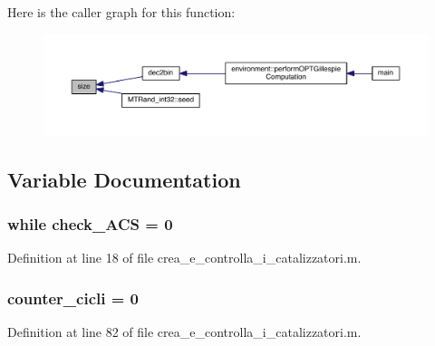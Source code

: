 Here is the caller graph for this function\-:\nopagebreak
\begin{figure}[H]
\begin{center}
\leavevmode
\includegraphics[width=350pt]{a00062_ae113ea7f9e515a12ac4b5595c6faf61e_icgraph}
\end{center}
\end{figure}




\subsection{Variable Documentation}
\hypertarget{a00062_a516aa1002f0c1375a671e40ee7b79e07}{
\subsubsection[{check\-\_\-\-A\-C\-S}]{\setlength{\rightskip}{0pt plus 5cm}while check\-\_\-\-A\-C\-S = 0}}\label{a00062_a516aa1002f0c1375a671e40ee7b79e07}


Definition at line 18 of file crea\-\_\-e\-\_\-controlla\-\_\-i\-\_\-catalizzatori.\-m.

\hypertarget{a00062_a8b5c7ae18fb63e6cb42a3eac42f1f29e}{
\subsubsection[{counter\-\_\-cicli}]{\setlength{\rightskip}{0pt plus 5cm}counter\-\_\-cicli = 0}}\label{a00062_a8b5c7ae18fb63e6cb42a3eac42f1f29e}


Definition at line 82 of file crea\-\_\-e\-\_\-controlla\-\_\-i\-\_\-catalizzatori.\-m.

